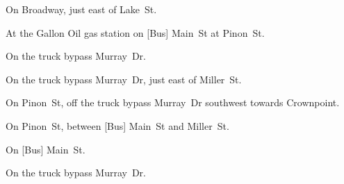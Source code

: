 
\begin{LocationList}

On Broadway, just east of Lake~St.

At the Gallon Oil gas station on [Bus] Main~St at Pinon~St.

\Location{\GarageHQ \Garage}
On the truck bypass  Murray~Dr.

On the truck bypass  Murray~Dr, just east of Miller~St.

On Pinon~St, off the truck bypass  Murray~Dr southwest towards Crownpoint.

On Pinon~St, between [Bus] Main~St and Miller~St.

\Location{\RecruitmentAgency \Recruitment}
On [Bus] Main~St.

On the truck bypass  Murray~Dr.

\end{LocationList}
